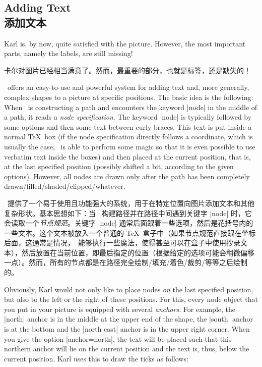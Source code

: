 

\subsection{Adding Text\\添加文本}

Karl is, by now, quite satisfied with the picture. However, the most important
parts, namely the labels, are still missing!

卡尔对图片已经相当满意了。然而，最重要的部分，也就是标签，还是缺失的！


\tikzname\ offers an easy-to-use and powerful system for adding text and, more
generally, complex shapes to a picture at specific positions. The basic idea is
the following: When \tikzname\ is constructing a path and encounters the
keyword |node| in the middle of a path, it reads a \emph{node specification}.
The keyword |node| is typically followed by some options and then some text
between curly braces. This text is put inside a normal \TeX\ box (if the node
specification directly follows a coordinate, which is usually the case,
\tikzname\ is able to perform some magic so that it is even possible to use
verbatim text inside the boxes) and then placed at the current position, that
is, at the last specified position (possibly shifted a bit, according to the
given options). However, all nodes are drawn only after the path has been
completely drawn/filled/shaded/clipped/whatever.

\tikzname\ 提供了一个易于使用且功能强大的系统，用于在特定位置向图片添加文本和其他复杂形状。基本思想如下：当 \tikzname\ 构建路径并在路径中间遇到关键字 |node| 时，它会读取一个\emph{节点规范}。关键字 |node| 通常后面跟着一些选项，然后是花括号内的一些文本。这个文本被放入一个普通的 \TeX\ 盒子中（如果节点规范直接跟在坐标后面，这通常是情况，\tikzname\ 能够执行一些魔法，使得甚至可以在盒子中使用抄录文本），然后放置在当前位置，即最后指定的位置（根据给定的选项可能会稍微偏移一点）。然而，所有的节点都是在路径完全绘制/填充/着色/裁剪/等等之后绘制的。

\begin{codeexample}[]
\end{codeexample}

Obviously, Karl would not only like to place nodes \emph{on} the last specified
position, but also to the left or the right of these positions. For this, every
node object that you put in your picture is equipped with several
\emph{anchors}. For example, the |north| anchor is in the middle at the upper
end of the shape, the |south| anchor is at the bottom and the |north east|
anchor is in the upper right corner. When you give the option |anchor=north|,
the text will be placed such that this northern anchor will lie on the current
position and the text is, thus, below the current position. Karl uses this to
draw the ticks as follows:

